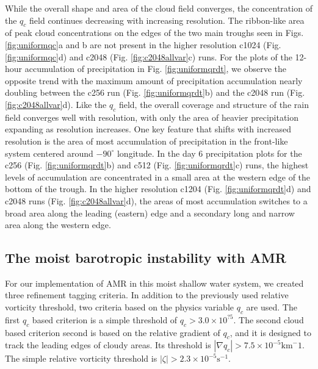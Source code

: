 While the overall shape and area of the cloud field converges, the concentration
of the $q_c$ field continues decreasing with increasing resolution.
The ribbon-like area of peak cloud concentrations on the edges of the two main troughs
seen in Figs. \ref{fig:uniformqc}a and b are not present in the higher resolution c1024
(Fig. \ref{fig:uniformqc}d) and c2048 (Fig. \ref{fig:c2048allvar}c) runs. For the
plots of the 12-hour accumulation of precipitation in Fig. \ref{fig:uniformqrdt}, we
observe the opposite trend with the maximum amount of precipitation accumulation 
nearly doubling between the c256 run (Fig. \ref{fig:uniformqrdt}b) and the
c2048 run (Fig. \ref{fig:c2048allvar}d). Like the $q_c$ field, the overall coverage and 
structure of the rain field converges well with resolution, with only the area of 
heavier precipitation expanding as resolution increases. One key feature that
shifts with increased resolution is the area of most accumulation of precipitation 
in the front-like system centered around $-90^\circ$ longitude. In the day 6 
precipitation plots for the c256 (Fig. \ref{fig:uniformqrdt}b) and c512 
(Fig. \ref{fig:uniformqrdt}c) runs, the highest levels of accumulation
are concentrated in a small area at the western edge of the bottom
of the trough. In the higher resolution c1204 (Fig. \ref{fig:uniformqrdt}d)
and c2048 runs (Fig. \ref{fig:c2048allvar}d), the areas of most accumulation 
switches to a broad area along the leading (eastern) edge and
a secondary long and narrow area along the western edge.

\subsection{The moist barotropic instability with AMR}
  For our implementation of AMR in this moist shallow water
system, we created three refinement tagging criteria. In addition to
the previously used relative vorticity threshold, two criteria based
on the physics variable $q_c$ are used. The first $q_c$ based criterion is a 
simple threshold of $q_c > 3.0 \times 10^{?5}$. The second cloud based 
criterion second is based on the relative gradient of $q_c$, 
and it is designed to track the leading edges of cloudy areas. 
Its threshold is $|\nabla q_c| > 7.5\times 10^{-5}\mathrm{km}^-1$.
The simple relative vorticity threshold is $|\zeta| > 2.3 \times 10^{-5} \mathrm{s}^{-1}$.

